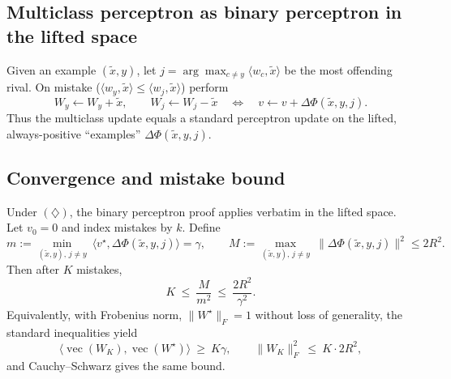 \documentclass[11pt]{article}
\begin{document}
\subsection{Multiclass perceptron as binary perceptron in the lifted space}
Given an example $(\tilde x,y)$, let $j=\arg\max_{c\ne y}\langle w_c,\tilde x\rangle$ be the most offending rival. On mistake ($\langle w_y,\tilde x\rangle\le\langle w_j,\tilde x\rangle$) perform
\[
W_y\leftarrow W_y+\tilde x,\qquad W_j\leftarrow W_j-\tilde x
\quad\Longleftrightarrow\quad
v\leftarrow v+\Delta\Phi(\tilde x,y,j).
\]
Thus the multiclass update equals a standard perceptron update on the lifted, always-positive “examples” $\Delta\Phi(\tilde x,y,j)$.

\subsection{Convergence and mistake bound}
Under $(\diamondsuit)$, the binary perceptron proof applies verbatim in the lifted space. Let $v_0=0$ and index mistakes by $k$. Define
\[
m:=\min_{(\tilde x,y),\,j\ne y}\ \langle v^\star,\Delta\Phi(\tilde x,y,j)\rangle=\gamma,
\qquad
M:=\max_{(\tilde x,y),\,j\ne y}\ \|\Delta\Phi(\tilde x,y,j)\|^2\le 2R^2.
\]
Then after $K$ mistakes,
\[
K\ \le\ \frac{M}{m^2}\ \le\ \frac{2R^2}{\gamma^2}.
\]
Equivalently, with Frobenius norm, $\|W^\star\|_F=1$ without loss of generality, the standard inequalities yield
\[
\langle \operatorname{vec}(W_K),\operatorname{vec}(W^\star)\rangle\ \ge\ K\gamma,
\qquad
\|W_K\|_F^2\ \le\ K\cdot 2R^2,
\]
and Cauchy–Schwarz gives the same bound.
\end{document}
